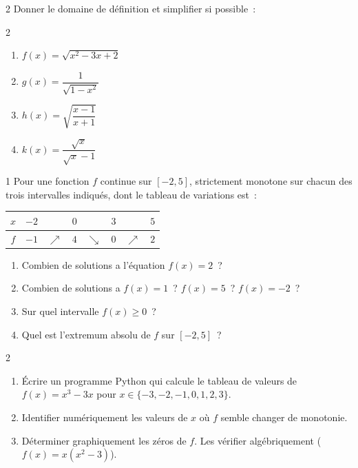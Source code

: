 \begin{exo}{2}
Donner le domaine de d\'efinition et simplifier si possible~:
\begin{multicols}{2}
\begin{enumerate}
  \item $f(x)=\sqrt{x^2-3x+2}$
  \item $g(x)=\dfrac{1}{\sqrt{1-x^2}}$
  \item $h(x)=\sqrt{\dfrac{x-1}{x+1}}$
  \item $k(x)=\dfrac{\sqrt{x}}{\sqrt{x}-1}$
\end{enumerate}
\end{multicols}
\end{exo}

\begin{exo}{1}
Pour une fonction $f$ continue sur $[-2,5]$, strictement monotone sur
chacun des trois intervalles indiqu\'es, dont le tableau de variations est~:
\begin{center}
\renewcommand{\arraystretch}{1.8}
\begin{tabular}{|c|ccccccc|}
\hline
$x$ & $-2$ & & $0$ & & $3$ & & $5$ \\
\hline
$f$ & $-1$ & $\nearrow$ & $4$ & $\searrow$ & $0$ & $\nearrow$ & $2$ \\
\hline
\end{tabular}
\end{center}
\begin{enumerate}
  \item Combien de solutions a l'\'equation $f(x)=2$~?
  \item Combien de solutions a $f(x)=1$~? $f(x)=5$~? $f(x)=-2$~?
  \item Sur quel intervalle $f(x)\geq0$~?
  \item Quel est l'extremum absolu de $f$ sur $[-2,5]$~?
\end{enumerate}
\end{exo}

\begin{exo}{2}
\begin{enumerate}
  \item \'Ecrire un programme Python qui calcule le tableau de valeurs
        de $f(x)=x^3-3x$ pour $x\in\{-3,-2,-1,0,1,2,3\}$.
  \item Identifier num\'eriquement les valeurs de $x$ o\`u $f$ semble changer
        de monotonie.
  \item D\'eterminer graphiquement les z\'eros de $f$.
        Les v\'erifier alg\'ebriquement ($f(x)=x(x^2-3)$).
\end{enumerate}
\end{exo}

